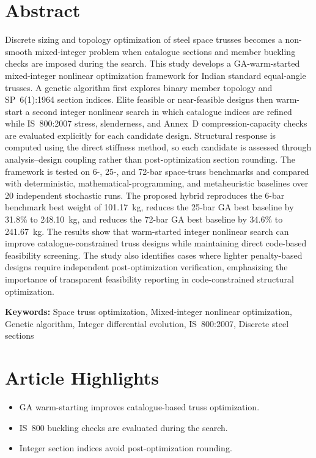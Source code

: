 \documentclass[lineno,pdflatex,sn-mathphys-num]{sn-jnl}
\begin{document}
\section*{Abstract}
Discrete sizing and topology optimization of steel space trusses becomes a
non-smooth mixed-integer problem when catalogue sections and member buckling
checks are imposed during the search. This study develops a
GA-warm-started mixed-integer nonlinear optimization framework for Indian
standard equal-angle trusses. A genetic algorithm first explores binary
member topology and SP~6(1):1964 section indices. Elite feasible or
near-feasible designs then warm-start a second integer nonlinear search in
which catalogue indices are refined while IS~800:2007 stress, slenderness,
and Annex~D compression-capacity checks are evaluated explicitly for each
candidate design. Structural response is computed using the direct stiffness
method, so each candidate is assessed through analysis--design coupling
rather than post-optimization section rounding. The framework is tested on
6-, 25-, and 72-bar space-truss benchmarks and compared with deterministic,
mathematical-programming, and metaheuristic baselines over 20 independent
stochastic runs. The proposed hybrid reproduces the 6-bar benchmark best
weight of 101.17~kg, reduces the 25-bar GA best baseline by 31.8\% to 248.10~kg,
and reduces the 72-bar GA best baseline by 34.6\% to 241.67~kg. The results show
that warm-started integer nonlinear search can improve catalogue-constrained
truss designs while maintaining direct code-based feasibility screening. The
study also identifies cases where lighter penalty-based designs require
independent post-optimization verification, emphasizing the importance of
transparent feasibility reporting in code-constrained structural
optimization.

\vspace{0.75em}
\noindent\textbf{Keywords:} Space truss optimization, Mixed-integer nonlinear optimization, Genetic algorithm, Integer differential evolution, IS~800:2007, Discrete steel sections

\vspace{1em}
\section*{Article Highlights}
\begin{itemize}
  \item GA warm-starting improves catalogue-based truss optimization.
  \item IS~800 buckling checks are evaluated during the search.
  \item Integer section indices avoid post-optimization rounding.
\end{itemize}
\end{document}
